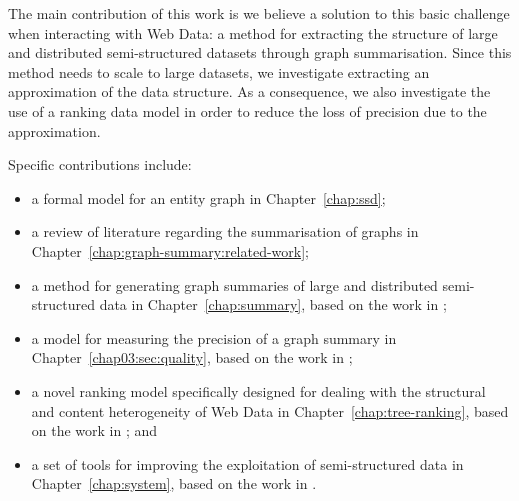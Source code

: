 The main contribution of this work is we believe a solution to this basic challenge when interacting with Web Data: a method for extracting the structure of large and distributed semi-structured datasets through graph summarisation. Since this method needs to scale to large datasets, we investigate extracting an approximation of the data structure. As a consequence, we also investigate the use of a ranking data model in order to reduce the loss of precision due to the approximation.

Specific contributions include:
\begin{itemize}
	\item a formal model for an entity graph in Chapter~\ref{chap:ssd};
	\item a review of literature regarding the summarisation of graphs in Chapter~\ref{chap:graph-summary:related-work};
	\item a method for generating graph summaries of large and distributed semi-structured data in Chapter~\ref{chap:summary}, based on the work in \cite{campinas:2012:dexa,campinas:2013:efficiency};
	\item a model for measuring the precision of a graph summary in Chapter~\ref{chap03:sec:quality}, based on the work in \cite{campinas:2013:efficiency};
	\item a novel ranking model specifically designed for dealing with the structural and content heterogeneity of Web Data in Chapter~\ref{chap:tree-ranking}, based on the work in \cite{campinas:2011:semsearch,campinas:2012:bm25mf}; and
	\item a set of tools for improving the exploitation of semi-structured data in Chapter~\ref{chap:system}, based on the work in \cite{auer:2014:linked}.
\end{itemize}
